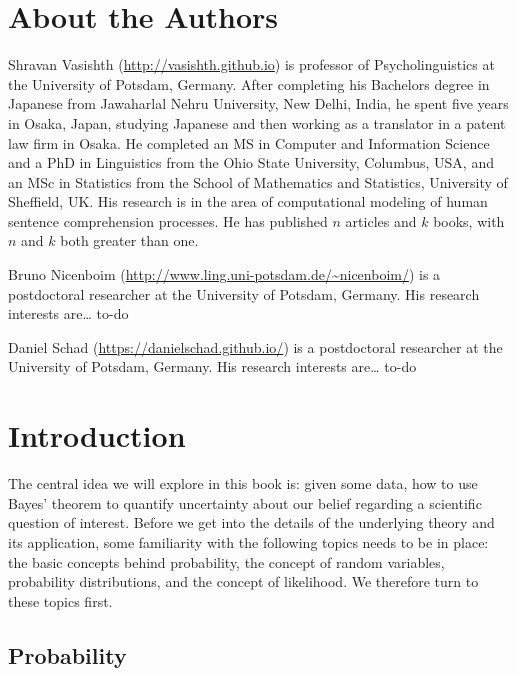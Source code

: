 \documentclass[12pt,]{krantz}
\begin{document}
\hypertarget{about-the-authors}{%
\chapter*{About the Authors}\label{about-the-authors}}


Shravan Vasishth (\url{http://vasishth.github.io}) is professor of Psycholinguistics at the University of Potsdam, Germany. After completing his Bachelors degree in Japanese from Jawaharlal Nehru University, New Delhi, India, he spent five years in Osaka, Japan, studying Japanese and then working as a translator in a patent law firm in Osaka. He completed an MS in Computer and Information Science and a PhD in Linguistics from the Ohio State University, Columbus, USA, and an MSc in Statistics from the School of Mathematics and Statistics, University of Sheffield, UK. His research is in the area of computational modeling of human sentence comprehension processes. He has published \(n\) articles and \(k\) books, with \(n\) and \(k\) both greater than one.

Bruno Nicenboim (\url{http://www.ling.uni-potsdam.de/~nicenboim/}) is a postdoctoral researcher at the University of Potsdam, Germany. His research interests are\ldots{} to-do

Daniel Schad (\url{https://danielschad.github.io/}) is a postdoctoral researcher at the University of Potsdam, Germany. His research interests are\ldots{} to-do

\mainmatter

\hypertarget{introduction}{%
\chapter{Introduction}\label{introduction}}

The central idea we will explore in this book is: given some data, how to use Bayes' theorem to quantify uncertainty about our belief regarding a scientific question of interest. Before we get into the details of the underlying theory and its application, some familiarity with the following topics needs to be in place: the basic concepts behind probability, the concept of random variables, probability distributions, and the concept of likelihood. We therefore turn to these topics first.

\hypertarget{introprob}{%
\section{Probability}\label{introprob}}
\end{document}
